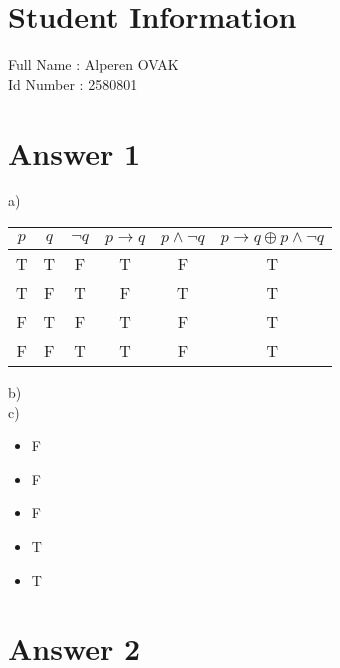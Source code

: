 \documentclass[12pt]{article}
\begin{document}
\section*{Student Information } 
Full Name :  Alperen OVAK\\
Id Number :  2580801\\

\section*{Answer 1}
\hspace{5mm} a)\\
\begin{table}[H]
\small
\centering
\begin{tabular}{|c|c|c|c|c|c|}
\hline
$p$ & $q$ & $\neg q$ & $p\rightarrow q$ & $ p\wedge \neg q$ & $ p\rightarrow q \oplus p\wedge \neg q $\\
\hline
T & T & F & T & F & T \\
T & F & T & F & T & T \\
F & T & F & T & F & T \\
F & F & T & T & F & T \\
\hline
\end{tabular}
\end{table}

\hspace{5mm} b)\\

\hspace{5mm} c)\\
\begin{itemize}
    \item F
    \item F
    \item F
    \item T
    \item T
\end{itemize}

\section*{Answer 2}
\end{document}
